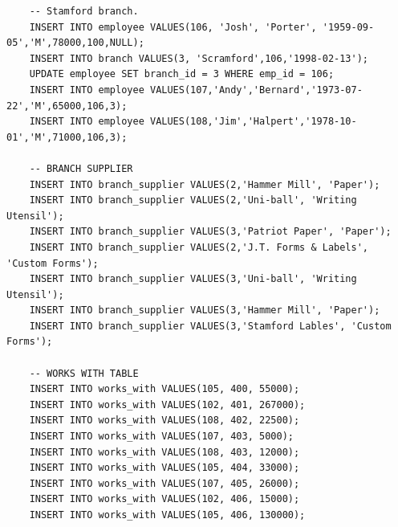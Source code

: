 \begin{verbatim}
    -- Stamford branch.
    INSERT INTO employee VALUES(106, 'Josh', 'Porter', '1959-09-05','M',78000,100,NULL);
    INSERT INTO branch VALUES(3, 'Scramford',106,'1998-02-13');
    UPDATE employee SET branch_id = 3 WHERE emp_id = 106;
    INSERT INTO employee VALUES(107,'Andy','Bernard','1973-07-22','M',65000,106,3);
    INSERT INTO employee VALUES(108,'Jim','Halpert','1978-10-01','M',71000,106,3);

    -- BRANCH SUPPLIER
    INSERT INTO branch_supplier VALUES(2,'Hammer Mill', 'Paper');
    INSERT INTO branch_supplier VALUES(2,'Uni-ball', 'Writing Utensil');
    INSERT INTO branch_supplier VALUES(3,'Patriot Paper', 'Paper');
    INSERT INTO branch_supplier VALUES(2,'J.T. Forms & Labels', 'Custom Forms');
    INSERT INTO branch_supplier VALUES(3,'Uni-ball', 'Writing Utensil');
    INSERT INTO branch_supplier VALUES(3,'Hammer Mill', 'Paper');
    INSERT INTO branch_supplier VALUES(3,'Stamford Lables', 'Custom Forms');

    -- WORKS WITH TABLE
    INSERT INTO works_with VALUES(105, 400, 55000);
    INSERT INTO works_with VALUES(102, 401, 267000);
    INSERT INTO works_with VALUES(108, 402, 22500);
    INSERT INTO works_with VALUES(107, 403, 5000);
    INSERT INTO works_with VALUES(108, 403, 12000);
    INSERT INTO works_with VALUES(105, 404, 33000);
    INSERT INTO works_with VALUES(107, 405, 26000);
    INSERT INTO works_with VALUES(102, 406, 15000);
    INSERT INTO works_with VALUES(105, 406, 130000);
\end{verbatim}
